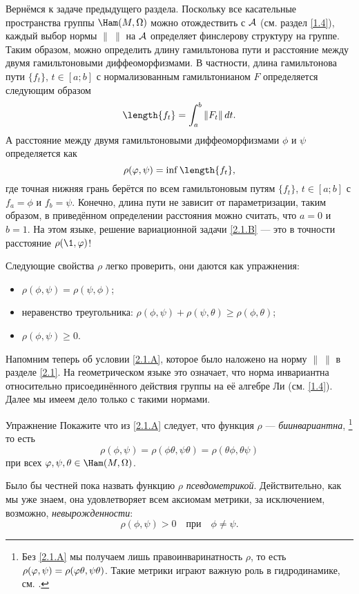 Вернёмся к задаче предыдущего раздела.
Поскольку все касательные пространства группы $\Ham(M, \Omega)$ можно
отождествить с $\mathcal{A}$ (см. раздел \ref{1.4}), каждый выбор нормы
$\|\ \|$ на $\mathcal{A}$ определяет финслерову структуру на группе.
Таким образом, можно определить длину гамильтонова пути и расстояние между двумя гамильтоновыми диффеоморфизмами.
В частности, длина гамильтонова пути $\{f_t\}$, $t \in [a; b]$ с нормализованным гамильтонианом $F$ определяется следующим образом 
\[\length\{f_t\}=\int_a^b \| F_t \|\,dt.\]
А расстояние между двумя гамильтоновыми диффеоморфизмами $\phi$ и $\psi$ определяется как \index[symb]{$\rho$}
\[\rho (\phi, \psi) = \inf \length \{f_t\},\] 
где точная нижняя грань берётся по всем гамильтоновым путям $\{f_t\}$, $t \in [a; b]$ с $f_a = \phi$ и $f_b = \psi$.
Конечно, длина пути не зависит от параметризации, таким образом, в приведённом определении расстояния можно считать, что $a = 0$ и $b = 1$.
На этом языке, решение вариационной задачи
\ref{2.1.B} — это в точности расстояние $\rho (\1, \phi)$!

Следующие свойства $\rho$ легко проверить,
они даются как упражнения:
\begin{itemize}
\item $\rho (\phi, \psi) = \rho (\psi, \phi)$;
\item неравенство треугольника: $\rho (\phi, \psi) + \rho (\psi, \theta) \ge \rho (\phi, \theta)$;
\item $\rho (\phi, \psi) \ge 0$.
\end{itemize}

Напомним теперь об условии \ref{2.1.A}, которое было наложено на норму $\|\ \|$ в разделе \ref{2.1}.
На геометрическом языке это означает, что норма инвариантна относительно присоединённого действия группы на её алгебре Ли (см. \ref{1.4}).
Далее мы имеем дело только с такими нормами.

\begin{ex*}{Упражнение}
Покажите что из \ref{2.1.A} следует, что функция $\rho$ — \emph{биинвариантна},%
\footnote{Без \ref{2.1.A} мы получаем лишь правоинваринатность $\rho$, то есть $\rho (\phi, \psi) \z= \rho (\phi\theta, \psi\theta)$.
Такие метрики играют важную роль в гидродинамике, см. \cite{AK}.}
то есть
\[\rho (\phi, \psi) = \rho (\phi \theta, \psi \theta) = \rho (\theta\phi, \theta\psi)\]
при всех $\phi, \psi, \theta \in \Ham (M, \Omega)$.
\end{ex*}

Было бы честней пока назвать функцию $\rho$ \emph{псевдометрикой}.
Действительно, как мы уже знаем, она удовлетворяет всем аксиомам метрики, за исключением, возможно, {}\emph{невырожденности}: 
\begin{equation}
\rho (\phi, \psi)> 0
\quad\text{при}\quad
\phi \ne \psi.
\label{eq:2.2.A}
\end{equation}

